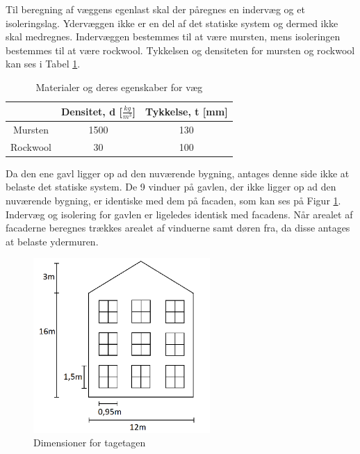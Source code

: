Til beregning af væggens egenlast skal der påregnes en indervæg og et isoleringslag. Ydervæggen ikke er en del af det statiske system og dermed ikke skal medregnes. Indervæggen bestemmes til at være mursten, mens isoleringen bestemmes til at være rockwool. Tykkelsen og densiteten for mursten og rockwool kan ses i Tabel \ref{tab:murogwool}.

\begin{table}
	\begin{center}
		\begin{tabular}{|c|c|c|}
			\hline
			& Densitet, d [$\frac{kg}{m^3}$] & Tykkelse, t [mm] \\ \hline
			Mursten  & 1500  & 130     \\ \hline
			Rockwool & 30 & 100              \\ \hline
		\end{tabular}
		\caption{Materialer og deres egenskaber for væg \citep{murstendensitet} \citep{indervaeg} \citep{densitet} \citep{isolering}}
		\label{tab:murogwool}
	\end{center}
\end{table}

Da den ene gavl ligger op ad den nuværende bygning, antages denne side ikke at belaste det statiske system. 
\newline \indent{     }  De 9 vinduer på gavlen, der ikke ligger op ad den nuværende bygning, er identiske med dem på facaden, som kan ses på Figur \ref{fig:gavl}. Indervæg og isolering for gavlen er ligeledes identisk med facadens.
\newline \indent{     }  Når arealet af facaderne beregnes trækkes arealet af vinduerne samt døren fra, da disse antages at belaste ydermuren.

\begin{figure}[H]
	\centering
	\includegraphics[width=0.6\textwidth]{billeder/facadevestellerost.png}
	\caption{Dimensioner for tagetagen}
	\label{fig:gavl}
\end{figure}


